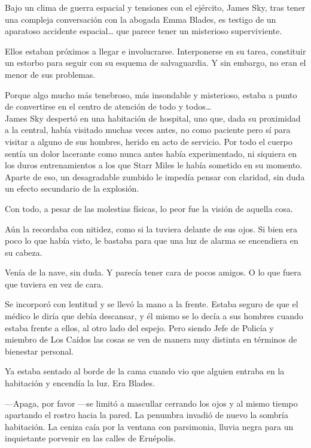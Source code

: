 \begin{prev}
    Bajo un clima de guerra espacial y tensiones con el ejército, James Sky, tras tener una compleja conversación con la abogada Emma Blades, es testigo de un aparatoso accidente espacial\dots{} que parece tener un misterioso superviviente.
\end{prev}

\noindent{}Ellos estaban próximos a llegar e involucrarse. Interponerse en su tarea, constituir un estorbo para seguir con su esquema de salvaguardia. Y sin embargo, no eran el menor de sus problemas.

Porque algo mucho más tenebroso, más insondable y misterioso, estaba a punto de convertirse en el centro de atención de todo y todos\dots\\

\noindent{}James Sky despertó en una habitación de hospital, uno que, dada su proximidad a la central, había visitado muchas veces antes, no como paciente pero sí para visitar a alguno de sus hombres, herido en acto de servicio. Por todo el cuerpo sentía un dolor lacerante como nunca antes había experimentado, ni siquiera en los duros entrenamientos a los que Starr Miles le había sometido en su momento. Aparte de eso, un desagradable zumbido le impedía pensar con claridad, sin duda un efecto secundario de la explosión.

Con todo, a pesar de las molestias físicas, lo peor fue la visión de aquella cosa.

Aún la recordaba con nitidez, como si la tuviera delante de sus ojos. Si bien era poco lo que había visto, le bastaba para que una luz de alarma se encendiera en su cabeza.

Venía de la nave, sin duda. Y parecía tener cara de pocos amigos. O lo que fuera que tuviera en vez de cara.

Se incorporó con lentitud y se llevó la mano a la frente. Estaba seguro de que el médico le diría que debía descansar, y él mismo se lo decía a sus hombres cuando estaba frente a ellos, al otro lado del espejo. Pero siendo Jefe de Policía y miembro de Los Caídos las cosas se ven de manera muy distinta en términos de bienestar personal.

Ya estaba sentado al borde de la cama cuando vio que alguien entraba en la habitación y encendía la luz. Era Blades.

---Apaga, por favor ---se limitó a mascullar cerrando los ojos y al mismo tiempo apartando el rostro hacia la pared. La penumbra invadió de nuevo la sombría habitación. La ceniza caía por la ventana con parsimonia, lluvia negra para un inquietante porvenir en las calles de Ernépolis.

